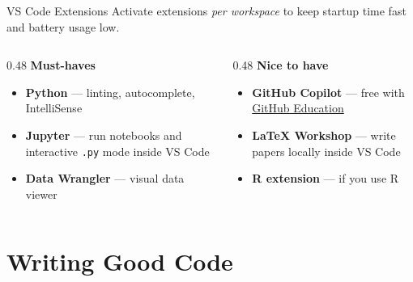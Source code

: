 \documentclass[13pt, aspectratio=169]{beamer}
\begin{document}
\begin{frame}{VS Code Extensions}
    Activate extensions \textit{per workspace} to keep startup time fast and battery usage low.

    \vspace{0.5em}
    \begin{columns}
        \begin{column}{0.48\textwidth}
            \textbf{Must-haves}
            \begin{itemize}
                \item \textbf{Python} — linting, autocomplete, IntelliSense
                \item \textbf{Jupyter} — run notebooks and interactive \texttt{.py} mode inside VS Code
                \item \textbf{Data Wrangler} — visual data viewer
            \end{itemize}
        \end{column}
        \begin{column}{0.48\textwidth}
            \textbf{Nice to have}
            \begin{itemize}
                \item \textbf{GitHub Copilot} — free with \href{https://github.com/education}{GitHub Education}
                \item \textbf{LaTeX Workshop} — write papers locally inside VS Code
                \item \textbf{R extension} — if you use R
            \end{itemize}
        \end{column}
    \end{columns}
\end{frame}

\section{Writing Good Code}
\end{document}
